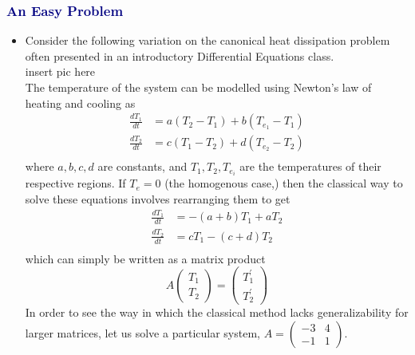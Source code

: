 \documentclass[landscape, a0]{sciposter}
\begin{document}
\begin{multicols}{4}
  \subsubsection*{\textcolor{navy}{An Easy Problem} }
    \begin{itemize}
      \item Consider the following variation on the canonical heat dissipation problem often presented in an introductory Differential Equations class. 
 	\\insert pic here
	\\The temperature of the system can be modelled using Newton's law of heating and cooling as
        \begin{align*}
          \frac{dT_1}{dt} &= a(T_2-T_1) + b(T_{e_1}-T_1)\\
          \frac{dT_2}{dt} &= c(T_1-T_2) + d(T_{e_2}-T_2)\\
        \end{align*}
        where $a,b,c,d$ are constants, and $T_{1}, T_2,T_{e_i}$ are the temperatures of their respective regions. If $T_e = 0$ (the homogenous case,) then the classical way to solve these equations involves rearranging them to get
        \begin{align*}
          \frac{dT_1}{dt} &= -(a+b)T_1+aT_2\\
          \frac{dT_2}{dt} &= cT_1-(c+d)T_2\\
        \end{align*}
which can simply be written as a matrix product $$A\left(\begin{array}{c}T_1\\T_2\end{array}\right) = \left(\begin{array}{c}T_1^\prime\\T_2^\prime\end{array}\right) $$ In order to see the way in which the classical method lacks generalizability for larger matrices, let us solve a particular system, $A = \left( \begin{array}{cc} -3 & 4 \\ -1 & 1 \end{array} \right)$. 
        
    \end{itemize}
    
%

\end{multicols}
\end{document}
